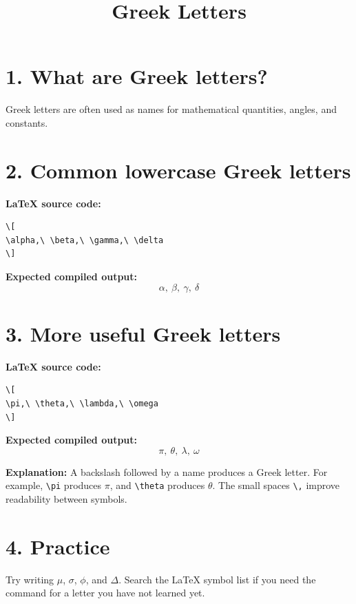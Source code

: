 \documentclass{article}
\title{Greek Letters}
\author{ }
\date{}
\begin{document}
\maketitle

\section*{1. What are Greek letters?}
Greek letters are often used as names for mathematical quantities, angles, and constants.

\section*{2. Common lowercase Greek letters}
\textbf{LaTeX source code:}
\begin{verbatim}
\[
\alpha,\ \beta,\ \gamma,\ \delta
\]
\end{verbatim}
\textbf{Expected compiled output:}
\[
\alpha,\ \beta,\ \gamma,\ \delta
\]

\section*{3. More useful Greek letters}
\textbf{LaTeX source code:}
\begin{verbatim}
\[
\pi,\ \theta,\ \lambda,\ \omega
\]
\end{verbatim}
\textbf{Expected compiled output:}
\[
\pi,\ \theta,\ \lambda,\ \omega
\]

\textbf{Explanation:} A backslash followed by a name produces a Greek letter. For example, \verb|\pi| produces \(\pi\), and \verb|\theta| produces \(\theta\). The small spaces \verb|\,| improve readability between symbols.

\section*{4. Practice}
Try writing \(\mu\), \(\sigma\), \(\phi\), and \(\Delta\). Search the LaTeX symbol list if you need the command for a letter you have not learned yet.
\end{document}
